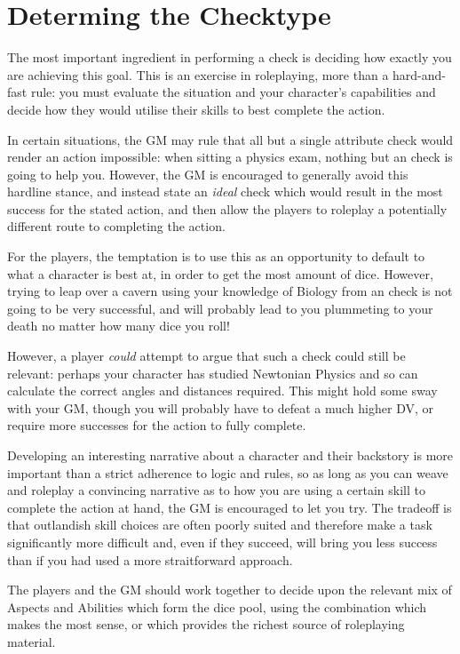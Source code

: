 \section{Determing the Checktype}

The most important ingredient in performing a check is deciding how exactly you are achieving this goal. This is an exercise in roleplaying, more than a hard-and-fast rule: you must evaluate the situation and your character's capabilities and decide how they would utilise their skills to best complete the action. 

In certain situations, the GM may rule that all but a single attribute check would render an action impossible: when sitting a physics exam, nothing but an  check is going to help you. However, the GM is encouraged to generally avoid this hardline stance, and instead state an {\it ideal} check which would result in the most success for the stated action, and then allow the players to roleplay a potentially different route to completing the action. 

For the players, the temptation is to use this as an opportunity to default to what a character is best at, in order to get the most amount of dice. However, trying to leap over a cavern using your knowledge of Biology from an  check is not going to be very successful, and will probably lead to you plummeting to your death no matter how many dice you roll! 

However, a player {\it could} attempt to argue that such a check could still be relevant: perhaps your character has studied Newtonian Physics and so can calculate the correct angles and distances required. This might hold some sway with your GM, though you will probably have to defeat a much higher DV, or require more successes for the action to fully complete. 

Developing an interesting narrative about a character and their backstory is more important than a strict adherence to logic and rules, so as long as you can weave and roleplay a convincing narrative as to how you are using a certain skill to complete the action at hand, the GM is encouraged to let you try. The tradeoff is that outlandish skill choices are often poorly suited and therefore make a task significantly more difficult and, even if they succeed, will bring you less success than if you had used a more straitforward approach. 

The players and the GM should work together to decide upon the relevant mix of Aspects and Abilities which form the dice pool, using the combination which makes the most sense, or which provides the richest source of roleplaying material. 


